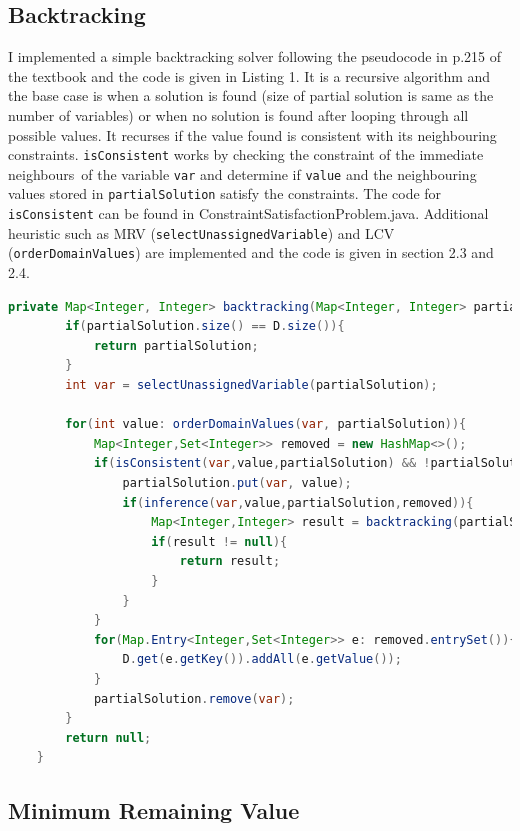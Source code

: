 \documentclass[9.5pt]{extarticle}
\begin{document}
\subsection{Backtracking}

I implemented a simple backtracking solver following the pseudocode in p.215 of the textbook and the code is given in Listing 1. It is a recursive algorithm and the base case is when a solution is found (size of partial solution is same as the number of variables) or when no solution is found after looping through all possible values. It recurses if the value found is consistent with its neighbouring constraints. \verb`isConsistent` works by checking the constraint of the immediate neighbours\ of the variable \verb`var` and determine if \verb`value` and the neighbouring values stored in \verb`partialSolution` satisfy the constraints. The code for \verb`isConsistent` can be found in ConstraintSatisfactionProblem.java. Additional heuristic such as MRV (\verb`selectUnassignedVariable`) and LCV (\verb`orderDomainValues`) are implemented and the code is given in section 2.3 and 2.4. 

\begin{lstlisting}[language=java,caption={Backtracking}]
	private Map<Integer, Integer> backtracking(Map<Integer, Integer> partialSolution) {
        if(partialSolution.size() == D.size()){
            return partialSolution;
        }
        int var = selectUnassignedVariable(partialSolution);

        for(int value: orderDomainValues(var, partialSolution)){
            Map<Integer,Set<Integer>> removed = new HashMap<>();
            if(isConsistent(var,value,partialSolution) && !partialSolution.containsKey(var)){
                partialSolution.put(var, value);
                if(inference(var,value,partialSolution,removed)){
                    Map<Integer,Integer> result = backtracking(partialSolution);
                    if(result != null){
                        return result;
                    }
                }
            }
            for(Map.Entry<Integer,Set<Integer>> e: removed.entrySet()){
                D.get(e.getKey()).addAll(e.getValue());
            }
            partialSolution.remove(var);
        }
        return null;
    }
\end{lstlisting}


\subsection{Minimum Remaining Value}
\end{document}
